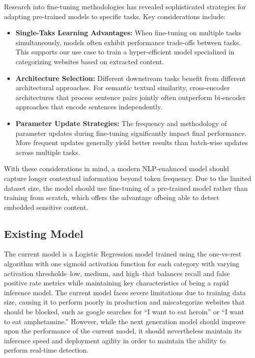 \documentclass[
  titlepage]{article}
\begin{document}
Research into fine-tuning methodologies has revealed sophisticated
strategies for adapting pre-trained models to specific tasks. Key
considerations include:

\begin{itemize}
\item
  \textbf{Single-Taks Learning Advantages:} When fine-tuning on multiple
  tasks simultaneously, models often exhibit performance trade-offs
  between tasks. This supports our use case to train a hyper-efficient
  model specialized in categorizing websites based on extracted content.
\item
  \textbf{Architecture Selection:} Different downstream tasks benefit
  from different architectural approaches. For semantic textual
  similarity, cross-encoder architectures that process sentence pairs
  jointly often outperform bi-encoder approaches that encode sentences
  independently.
\item
  \textbf{Parameter Update Strategies:} The frequency and methodology of
  parameter updates during fine-tuning significantly impact final
  performance. More frequent updates generally yield better results than
  batch-wise updates across multiple tasks.
\end{itemize}

With these considerations in mind, a modern NLP-enahnced model should
capture longer contextual information beyond token frequency. Due to the
limited dataset size, the model should use fine-tuning of a pre-trained
model rather than training from scratch, which offers the advantage
ofbeing able to detect embedded sensitive content.

\subsection{Existing Model}\label{existing-model}

The current model is a Logistic Regression model trained using the
one-vs-rest algorithm with one sigmoid activation function for each
category with varying activation thresholds--low, medium, and high--that
balances recall and false positive rate metrics while maintaining key
characteristics of being a rapid inference model. The current model
faces severe limitations due to training data size, causing it to
perform poorly in production and miscategorize websites that should be
blocked, such as google searches for ``I want to eat heroin'' or ``I
want to eat amphetamine.'' However, while the next generation model
should improve upon the performance of the current model, it should
nevertheless maintain its inference speed and deployment agility in
order to maintain the ability to perform real-time detection.
\end{document}
